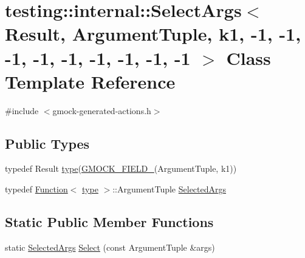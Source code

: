 \hypertarget{classtesting_1_1internal_1_1_select_args_3_01_result_00_01_argument_tuple_00_01k1_00_01-1_00_01-33116bd77067572e384b90e7c70b03c4}{}\section{testing\+:\+:internal\+:\+:Select\+Args$<$ Result, Argument\+Tuple, k1, -\/1, -\/1, -\/1, -\/1, -\/1, -\/1, -\/1, -\/1, -\/1 $>$ Class Template Reference}
\label{classtesting_1_1internal_1_1_select_args_3_01_result_00_01_argument_tuple_00_01k1_00_01-1_00_01-33116bd77067572e384b90e7c70b03c4}


{\ttfamily \#include $<$gmock-\/generated-\/actions.\+h$>$}

\subsection*{Public Types}
\begin{DoxyCompactItemize}
\item 
typedef Result \hyperlink{classtesting_1_1internal_1_1_select_args_3_01_result_00_01_argument_tuple_00_01k1_00_01-1_00_01-33116bd77067572e384b90e7c70b03c4_af1aee025a91b513b1d90a200748377dc}{type}(\hyperlink{gmock-generated-actions_8h_a6eb3ce92b0613603057a20ec9e593317}{G\+M\+O\+C\+K\+\_\+\+F\+I\+E\+L\+D\+\_\+}(Argument\+Tuple, k1))
\item 
typedef \hyperlink{structtesting_1_1internal_1_1_function}{Function}$<$ \hyperlink{classtesting_1_1internal_1_1_select_args_3_01_result_00_01_argument_tuple_00_01k1_00_01-1_00_01-33116bd77067572e384b90e7c70b03c4_af1aee025a91b513b1d90a200748377dc}{type} $>$\+::Argument\+Tuple \hyperlink{classtesting_1_1internal_1_1_select_args_3_01_result_00_01_argument_tuple_00_01k1_00_01-1_00_01-33116bd77067572e384b90e7c70b03c4_a40e5cbd362d7bdd16d0d60a39b7e5c14}{Selected\+Args}
\end{DoxyCompactItemize}
\subsection*{Static Public Member Functions}
\begin{DoxyCompactItemize}
\item 
static \hyperlink{classtesting_1_1internal_1_1_select_args_3_01_result_00_01_argument_tuple_00_01k1_00_01-1_00_01-33116bd77067572e384b90e7c70b03c4_a40e5cbd362d7bdd16d0d60a39b7e5c14}{Selected\+Args} \hyperlink{classtesting_1_1internal_1_1_select_args_3_01_result_00_01_argument_tuple_00_01k1_00_01-1_00_01-33116bd77067572e384b90e7c70b03c4_a7aaf6f5192da4e05fbc2bf595418546b}{Select} (const Argument\+Tuple \&args)
\end{DoxyCompactItemize}


